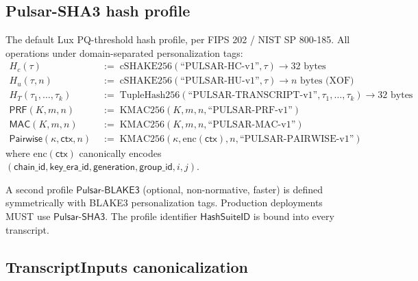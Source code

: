 
\subsection*{Pulsar-SHA3 hash profile}

\begin{definition}
\label{def:pulsar-sha3}
The default Lux PQ-threshold hash profile, per FIPS 202 / NIST SP 800-185.
All operations under domain-separated personalization tags:
\begin{align*}
H_c(\tau)               &\;:=\; \mathrm{cSHAKE256}(\text{``PULSAR-HC-v1''}, \tau) \to 32 \text{ bytes}\\
H_u(\tau, n)            &\;:=\; \mathrm{cSHAKE256}(\text{``PULSAR-HU-v1''}, \tau) \to n \text{ bytes (XOF)}\\
H_T(\tau_1, \ldots, \tau_k) &\;:=\; \mathrm{TupleHash256}(\text{``PULSAR-TRANSCRIPT-v1''}, \tau_1, \ldots, \tau_k) \to 32 \text{ bytes}\\
\mathsf{PRF}(K, m, n)   &\;:=\; \mathrm{KMAC256}(K, m, n, \text{``PULSAR-PRF-v1''})\\
\mathsf{MAC}(K, m, n)   &\;:=\; \mathrm{KMAC256}(K, m, n, \text{``PULSAR-MAC-v1''})\\
\mathsf{Pairwise}(\kappa, \mathsf{ctx}, n) &\;:=\;
  \mathrm{KMAC256}(\kappa, \mathrm{enc}(\mathsf{ctx}), n, \text{``PULSAR-PAIRWISE-v1''})
\end{align*}
where $\mathrm{enc}(\mathsf{ctx})$ canonically encodes
$(\mathsf{chain\_id}, \mathsf{key\_era\_id}, \mathsf{generation},
\mathsf{group\_id}, i, j)$.

A second profile $\mathsf{Pulsar\text{-}BLAKE3}$ (optional, non-normative,
faster) is defined symmetrically with BLAKE3 personalization tags.
Production deployments MUST use $\mathsf{Pulsar\text{-}SHA3}$.
The profile identifier $\mathsf{HashSuiteID}$ is bound into every transcript.
\end{definition}

\subsection*{TranscriptInputs canonicalization}

